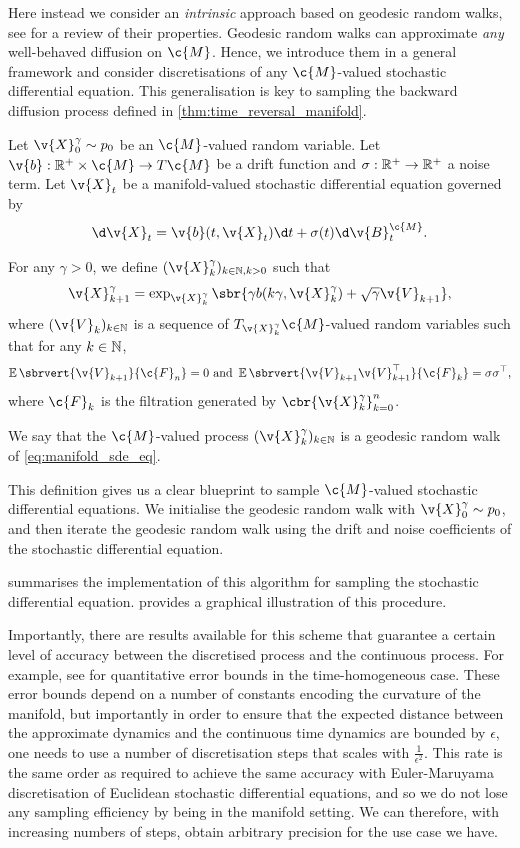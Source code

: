 Here instead we consider an \emph{intrinsic} approach based on geodesic random walks, see \textcite{jorgensen1975central} for a review of their properties.
Geodesic random walks can approximate \emph{any} well-behaved diffusion on \(\c{M}\).
Hence, we introduce them in a general framework and consider discretisations of any \(\c{M}\)-valued stochastic differential equation.
This generalisation is key to sampling the backward diffusion process defined in \cref{thm:time_reversal_manifold}.

\begin{definition}
	Let \(\v{X}^\gamma_0 \sim p_0\) be an \(\c{M}\)-valued random variable.
	Let \(\v{b}: \R^+ \x \c{M} \to T\c{M}\) be a drift function and \(\sigma: \mathbb{R}^+ \to \mathbb{R}^+\) a noise term.
	Let \(\v{X}_t\) be a manifold-valued stochastic differential equation governed by
	\[\d\v{X}_t = \v{b}(t, \v{X}_t) \d t + \sigma(t) \d\v{B}_t^{\c{M}}.\label{eq:manifold_sde_eq}\]

	For any \(\gamma > 0\), we define \((\v{X}_k^\gamma)_{k \in \N, k > 0}\) such that
	\[
		\v{X}_{k+1}^\gamma = \exp_{\v{X}_k^\gamma}\sbr{\gamma { b(k\gamma, \v{X}_k^\gamma) + \sqrt{\gamma} \v{V}_{k+1} }}
	,\] 
	where \((\v{V}_k)_{k \in \N}\) is a sequence of \(T_{\v{X}_k^\gamma}\c{M}\)-valued random variables such that for any \(k \in \mathbb{N}\), 
	\[
		\E\sbrvert{\v{V}_{k+1}}{\c{F}_n} = 0 \text{ and }\E\sbrvert{\v{V}_{k+1} \v{V}_{k+1}^\top}{\c{F}_k} = \sigma \sigma^\top
	,\] 
	where \(\c{F}_k\) is the filtration generated by \(\cbr{\v{X}_k^\gamma}_{k=0}^n\).

	We say that the \(\c{M}\)-valued process \((\v{X}_k^\gamma)_{k\in \N}\) is a geodesic random walk of \cref{eq:manifold_sde_eq}.
\end{definition}
This definition gives us a clear blueprint to sample \(\c{M}\)-valued stochastic differential equations.
We initialise the geodesic random walk with \(\v{X}_0^\gamma\sim p_0\), and then iterate the geodesic random walk using the drift and noise coefficients of the stochastic differential equation.

 summarises the implementation of this algorithm for sampling the stochastic differential equation.
 provides a graphical illustration of this procedure.

Importantly, there are results available for this scheme that guarantee a certain level of accuracy between the discretised process and the continuous process. 
For example, see \textcite{kuwada2012convergence,cheng2022theorymanifold} for quantitative error bounds in the time-homogeneous
case.
These error bounds depend on a number of constants encoding the curvature of the manifold, but importantly in order to ensure that the expected distance between the approximate dynamics and the continuous time dynamics are bounded by \(\epsilon\), one needs to use a number of discretisation steps that scales with \(\frac{1}{\epsilon^2}\).
This rate is the same order as required to achieve the same accuracy with Euler-Maruyama discretisation of Euclidean stochastic differential equations, and so we do not lose any sampling efficiency by being in the manifold setting.
We can therefore, with increasing numbers of steps, obtain arbitrary precision for the use case we have.

